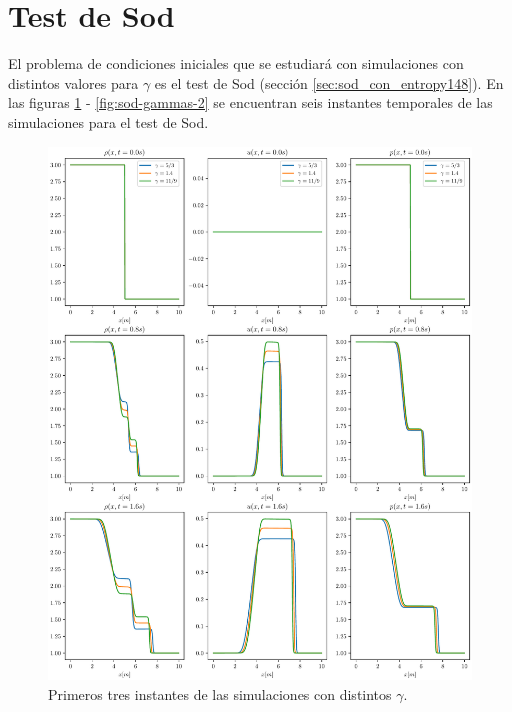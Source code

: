 \section{Test de Sod}
El problema de condiciones iniciales que se estudiará con simulaciones con distintos valores para $\gamma$ es el test de Sod (sección \ref{sec:sod_con_entropy148}). En las figuras \ref{fig:sod-gammas-1} - \ref{fig:sod-gammas-2} se encuentran seis instantes temporales de las simulaciones para el test de Sod.
\begin{figure}[H]
	\includegraphics[width=0.95\linewidth]{../euler1D/experimentos/graficas_sod/1.pdf}
	\caption{Primeros tres instantes de las simulaciones con distintos $\gamma$.}
	\label{fig:sod-gammas-1}
\end{figure}
